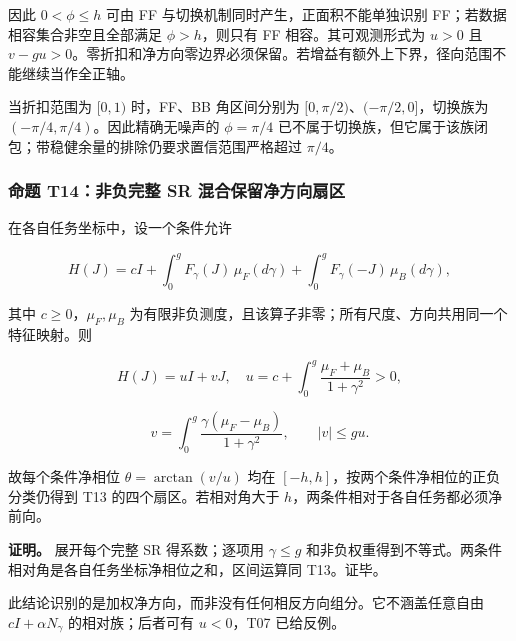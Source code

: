 \documentclass[11pt,a4paper]{article}
\begin{document}
因此 \(0<\phi\le h\) 可由 FF 与切换机制同时产生，正面积不能单独识别
FF；若数据相容集合非空且全部满足 \(\phi>h\)，则只有 FF
相容。其可观测形式为 \(u>0\) 且
\(v-gu>0\)。零折扣和净方向零边界必须保留。若增益有额外上下界，径向范围不能继续当作全正轴。

当折扣范围为 \([0,1)\) 时，FF、BB 角区间分别为
\([0,\pi/2)\)、\((-\pi/2,0]\)，切换族为
\((-\pi/4,\pi/4)\)。因此精确无噪声的 \(\phi=\pi/4\)
已不属于切换族，但它属于该族闭包；带稳健余量的排除仍要求置信范围严格超过
\(\pi/4\)。

\subsubsection{命题 T14：非负完整 SR
混合保留净方向扇区}\label{ux547dux9898-t14ux975eux8d1fux5b8cux6574-sr-ux6df7ux5408ux4fddux7559ux51c0ux65b9ux5411ux6247ux533a}

\par
\noindent\begin{minipage}{\linewidth}

在各自任务坐标中，设一个条件允许

\[
H(J)=cI+\int_0^g F_\gamma(J)\,\mu_F(d\gamma)
+\int_0^g F_\gamma(-J)\,\mu_B(d\gamma),
\]

\end{minipage}\par

\par
\noindent\begin{minipage}{\linewidth}

其中 \(c\ge0\)，\(\mu_F,\mu_B\)
为有限非负测度，且该算子非零；所有尺度、方向共用同一个特征映射。则

\[
H(J)=uI+vJ,\quad
u=c+\int_0^g\frac{\mu_F+\mu_B}{1+\gamma^2}>0,
\]

\end{minipage}\par

\[
v=\int_0^g\frac{\gamma(\mu_F-\mu_B)}{1+\gamma^2},
\qquad |v|\le gu.
\]

故每个条件净相位 \(\theta=\arctan(v/u)\) 均在
\([-h,h]\)，按两个条件净相位的正负分类仍得到 T13
的四个扇区。若相对角大于 \(h\)，两条件相对于各自任务都必须净前向。

\textbf{证明。} 展开每个完整 SR 得系数；逐项用 \(\gamma\le g\)
和非负权重得到不等式。两条件相对角是各自任务坐标净相位之和，区间运算同
T13。证毕。

此结论识别的是加权净方向，而非没有任何相反方向组分。它不涵盖任意自由
\(cI+\alpha N_\gamma\) 的相对族；后者可有 \(u<0\)，T07 已给反例。
\end{document}
